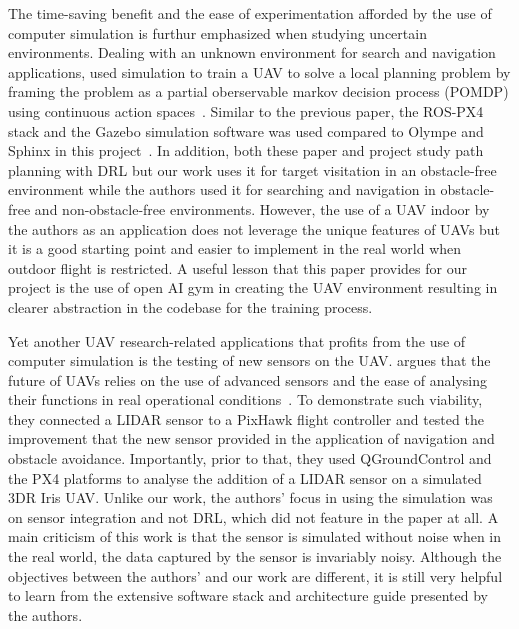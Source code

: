 \documentclass[../main.tex]{subfiles}
\begin{document}

The time-saving benefit and the ease of experimentation 
afforded by the use of computer simulation is furthur emphasized 
when studying uncertain environments.
Dealing with an unknown environment for search and navigation applications,
\citeauthor{Wal19} used simulation to train a UAV 
to solve a local planning problem
by framing the problem as a 
partial oberservable markov decision process (POMDP)
using continuous action spaces~\cite{Wal19}.
Similar to the previous paper, the ROS-PX4 stack and the Gazebo 
simulation software was used compared to Olympe and Sphinx 
in this project~\cite{Wal19}.
In addition, both these paper and project study path planning 
with DRL but our work uses it for target visitation 
in an obstacle-free environment 
while the authors used it for searching and navigation
in obstacle-free and non-obstacle-free environments.
However, the use of a UAV indoor by the authors as an application 
does not leverage the unique features of UAVs 
but it is a good starting point 
and easier to implement in the real world 
when outdoor flight is restricted.
A useful lesson that this paper provides for our project
is the use of open AI gym in creating the UAV environment
resulting in clearer abstraction in the codebase
for the training process.

Yet another UAV research-related applications 
that profits from the use of computer simulation 
is the testing of new sensors on the UAV.
\citeauthor{Gar20} argues that the future of UAVs
relies on the use of advanced sensors and 
the ease of analysing their functions
in real operational conditions~\cite{Gar20}.
To demonstrate such viability, they connected a LIDAR sensor
to a PixHawk flight controller and tested the improvement
that the new sensor provided
in the application of navigation and obstacle avoidance.
Importantly, prior to that, they used QGroundControl and the PX4
platforms to analyse the addition of a LIDAR sensor
on a simulated 3DR Iris UAV.
Unlike our work, the authors' focus in using the simulation
was on sensor integration and not DRL, 
which did not feature in the paper at all. 
A main criticism of this work is that 
the sensor is simulated without noise
when in the real world, the data captured
by the sensor is invariably noisy.
Although the objectives between the authors' and our work
are different, it is still very helpful to learn from
the extensive software stack and architecture guide 
presented by the authors.



\blindtext
\end{document}
